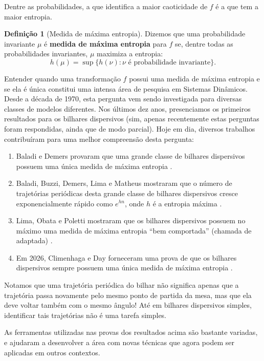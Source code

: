\documentclass{hipatia}
\theoremstyle{definition}
\newtheorem{definition}[theorem]{Definição}
\theoremstyle{remark}
\numberwithin{equation}{section}
\numberwithin{theorem}{section}
\begin{document}
Dentre as probabilidades, a que identifica a maior caoticidade de $f$ é a que tem a maior entropia.

\begin{definition}[Medida de máxima entropia]
Dizemos que uma probabilidade invariante $\mu$ é {\bf medida de máxima entropia} para $f$ se, dentre todas
as probabilidades invariantes, $\mu$ maximiza a entropia:
$$
h(\mu)=\sup\{h(\nu):\nu\text{ é probabilidade invariante}\}.
$$
\end{definition}

Entender quando uma transformação $f$ possui uma medida de máxima entropia e se ela é única constitui
uma intensa área de pesquisa em Sistemas Dinâmicos. Desde a década de 1970, esta pergunta vem sendo investigada
para diversas classes de modelos diferentes. Nos últimos dez anos, presenciamos os primeiros resultados
para os bilhares dispersivos (sim, apenas recentemente estas perguntas foram respondidas, ainda que de modo
parcial). Hoje em dia, diversos trabalhos contribuíram para uma melhor compreensão desta pergunta:
\begin{enumerate}[$\circ$]
\item Baladi e Demers provaram que uma grande classe de bilhares dispersivos possuem uma única medida de máxima entropia \cite{baladi-demers}.
\item Baladi, Buzzi, Demers, Lima e Matheus mostraram que o número de trajetórias periódicas desta grande classe de bilhares dispersivos cresce exponencialmente rápido como $e^{hn}$, onde $h$ é a entropia máxima
\cite{baladi-demers,buzzi,lima-matheus}.
\item Lima, Obata e Poletti mostraram que os bilhares dispersivos possuem no máximo uma medida de máxima entropia ``bem comportada'' (chamada de adaptada) \cite{lop}.
\item Em 2026, Climenhaga e Day forneceram uma prova de que os bilhares dispersivos sempre possuem uma única medida de máxima entropia \cite{climenhaga-day}.
\end{enumerate}
Notamos que uma trajetória periódica do bilhar não significa apenas que a trajetória passa novamente pelo mesmo ponto de partida da mesa, mas que ela deve voltar também com o mesmo ângulo! Até em bilhares dispersivos simples, identificar tais trajetórias não é uma tarefa simples.

As ferramentas utilizadas nas provas dos resultados acima são bastante variadas, e ajudaram a desenvolver a área com novas técnicas que agora podem ser aplicadas em outros contextos.
\end{document}
